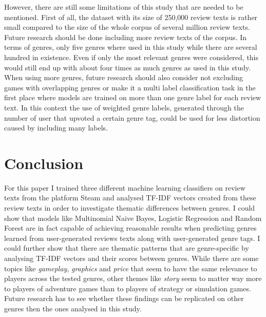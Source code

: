 \documentclass[11pt, a4paper]{article}
\begin{document}
However, there are still some limitations of this study that are needed to be mentioned.
First of all, the dataset with its size of 250,000 review texts is rather small compared to the size of the whole corpus
of several million review texts.
Future research should be done including more review texts of the corpus.
In terms of genres, only five genres where used in this study while there are several hundred in existence.
Even if only the most relevant genres were considered, this would still end up with about four times as much genres as
used in this study.
When using more genres, future research should also consider not excluding games with overlapping genres or make
it a multi label classification task in the first place where models are trained on more than one genre label for each
review text.
In this context the use of weighted genre labels, generated through the number of user that upvoted a certain genre tag,
could be used for less distortion caused by including many labels.


\section{Conclusion}\label{sec:conclusion}
For this paper I trained three different machine learning classifiers on review texts from the platform Steam and
analysed TF-IDF vectors created from these review texts in order to investigate thematic differences between
genres.
I could show that models like Multinomial Naive Bayes, Logistic Regression and Random Forest are in fact capable of
achieving reasonable results when predicting genres learned from user-generated reviews texts along with user-generated
genre tags.
I could further show that there are thematic patterns that are genre-specific by analysing TF-IDF vectors
and their scores between genres.
While there are some topics like \textit{gameplay}, \textit{graphics} and \textit{price} that seem to have the same
relevance to players across the tested genres, other themes like \textit{story} seem to matter way more to players of
adventure games than to players of strategy or simulation games.
Future research has to see whether these findings can be replicated on other genres then the ones analysed in this
study.


\clearpage

\printbibliography

\clearpage
\end{document}
